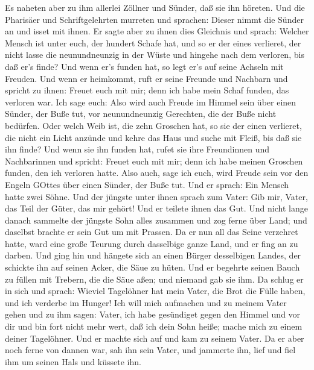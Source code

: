  Es naheten aber zu ihm allerlei Zöllner und Sünder, daß sie
ihn höreten.  Und die Pharisäer und Schriftgelehrten
murreten und sprachen: Dieser nimmt die Sünder an und isset mit ihnen.
 Er sagte aber zu ihnen dies Gleichnis und sprach:
 Welcher Mensch ist unter euch, der hundert Schafe hat, und
so er der eines verlieret, der nicht lasse die neunundneunzig in der
Wüste und hingehe nach dem verloren, bis daß er's finde? 
Und wenn er's funden hat, so legt er's auf seine Achseln mit Freuden.
 Und wenn er heimkommt, ruft er seine Freunde und Nachbarn
und spricht zu ihnen: Freuet euch mit mir; denn ich habe mein Schaf
funden, das verloren war.  Ich sage euch: Also wird auch
Freude im Himmel sein über einen Sünder, der Buße tut, vor
neunundneunzig Gerechten, die der Buße nicht bedürfen.  Oder
welch Weib ist, die zehn Groschen hat, so sie der einen verlieret, die
nicht ein Licht anzünde und kehre das Haus und suche mit Fleiß, bis daß
sie ihn finde?  Und wenn sie ihn funden hat, rufet sie ihre
Freundinnen und Nachbarinnen und spricht: Freuet euch mit mir; denn ich
habe meinen Groschen funden, den ich verloren hatte.  Also
auch, sage ich euch, wird Freude sein vor den Engeln GOttes über einen
Sünder, der Buße tut.  Und er sprach: Ein Mensch hatte zwei
Söhne.  Und der jüngste unter ihnen sprach zum Vater: Gib
mir, Vater, das Teil der Güter, das mir gehört! Und er teilete ihnen das
Gut.  Und nicht lange danach sammelte der jüngste Sohn
alles zusammen und zog ferne über Land; und daselbst brachte er sein Gut
um mit Prassen.  Da er nun all das Seine verzehret hatte,
ward eine große Teurung durch dasselbige ganze Land, und er fing an zu
darben.  Und ging hin und hängete sich an einen Bürger
desselbigen Landes, der schickte ihn auf seinen Acker, die Säue zu
hüten.  Und er begehrte seinen Bauch zu füllen mit Trebern,
die die Säue aßen; und niemand gab sie ihm.  Da schlug er
in sich und sprach: Wieviel Tagelöhner hat mein Vater, die Brot die
Fülle haben, und ich verderbe im Hunger!  Ich will mich
aufmachen und zu meinem Vater gehen und zu ihm sagen: Vater, ich habe
gesündiget gegen den Himmel und vor dir  und bin fort nicht
mehr wert, daß ich dein Sohn heiße; mache mich zu einem deiner
Tagelöhner.  Und er machte sich auf und kam zu seinem
Vater. Da er aber noch ferne von dannen war, sah ihn sein Vater, und
jammerte ihn, lief und fiel ihm um seinen Hals und küssete ihn.
